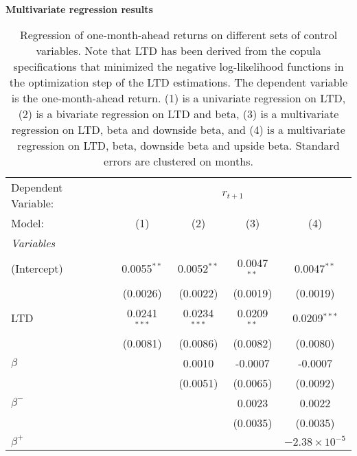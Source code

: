 \begin{table}[H]
\caption{\\ \large{\textbf{Multivariate regression results}}}
\captionsetup{justification = justified, width = \linewidth}
\caption*{Regression of one-month-ahead returns on different
                               sets of control variables. Note that LTD has been derived from the 
                               copula specifications that minimized the negative log-likelihood functions
                               in the optimization step of the LTD estimations. The dependent variable is
                               the one-month-ahead return. (1) is a univariate regression
                               on LTD, (2) is a bivariate regression on LTD and beta,
                               (3) is a multivariate regression on LTD, beta and downside 
                               beta, and (4) is a multivariate regression on LTD, beta,
                               downside beta and upside beta. Standard errors are clustered
                               on months.}
   \centering
\label{reg_clustered_on_time_1_size_bm_nll}
   \begin{tabular}{lcccc}
      \tabularnewline \midrule \midrule
      Dependent Variable: & \multicolumn{4}{c}{$r_{t+1}$}\\
      Model:         & (1)            & (2)            & (3)           & (4)\\  
      \midrule
      \emph{Variables}\\
      (Intercept)    & 0.0055$^{**}$  & 0.0052$^{**}$  & 0.0047$^{**}$ & 0.0047$^{**}$\\   
                     & (0.0026)       & (0.0022)       & (0.0019)      & (0.0019)\\   
      LTD            & 0.0241$^{***}$ & 0.0234$^{***}$ & 0.0209$^{**}$ & 0.0209$^{***}$\\   
                     & (0.0081)       & (0.0086)       & (0.0082)      & (0.0080)\\   
      $\beta$        &                & 0.0010         & -0.0007       & -0.0007\\   
                     &                & (0.0051)       & (0.0065)      & (0.0092)\\   
      $\beta^{-}$    &                &                & 0.0023        & 0.0022\\   
                     &                &                & (0.0035)      & (0.0035)\\   
      $\beta^{+}$    &                &                &               & $-2.38\times 10^{-5}$\\    

\end{tabular}
\end{table}
